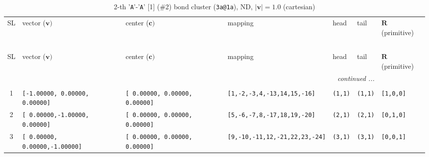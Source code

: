 \documentclass[fleqn,10pt,landscape]{jsarticle}
\begin{document}
\begin{longtable}[l]{cllllll}
\captionsetup{justification=raggedright, singlelinecheck=off}
\caption{2-th '\texttt{A}'-'\texttt{A}' [1] (\#2) bond cluster (\texttt{3a@1a}), ND, $|\bm{v}|=1.0$ (cartesian)}
 \\
 \hline \hline
SL & vector ($\bm{v})$ & center ($\bm{c})$ & mapping & head & tail & $\bm{R}$ (primitive) \\ \hline \endfirsthead

\multicolumn{6}{l}{\tablename\ \thetable{}} \\
 \hline \hline
SL & vector ($\bm{v})$ & center ($\bm{c})$ & mapping & head & tail & $\bm{R}$ (primitive) \\ \hline \endhead

 \hline \hline
\multicolumn{6}{r}{\footnotesize\it continued ...} \\ \endfoot

 \hline \hline
\multicolumn{6}{r}{} \\ \endlastfoot

1 & \texttt{[-1.00000, 0.00000, 0.00000]} & \texttt{[ 0.00000, 0.00000, 0.00000]} & \texttt{[1,-2,-3,4,-13,14,15,-16]} & \texttt{(1,1)} & \texttt{(1,1)} & \texttt{[1,0,0]} \\ \hline
2 & \texttt{[ 0.00000,-1.00000, 0.00000]} & \texttt{[ 0.00000, 0.00000, 0.00000]} & \texttt{[5,-6,-7,8,-17,18,19,-20]} & \texttt{(2,1)} & \texttt{(2,1)} & \texttt{[0,1,0]} \\ \hline
3 & \texttt{[ 0.00000, 0.00000,-1.00000]} & \texttt{[ 0.00000, 0.00000, 0.00000]} & \texttt{[9,-10,-11,12,-21,22,23,-24]} & \texttt{(3,1)} & \texttt{(3,1)} & \texttt{[0,0,1]} \\
\end{longtable}
\renewcommand{\arraystretch}{1.6}
\end{document}
